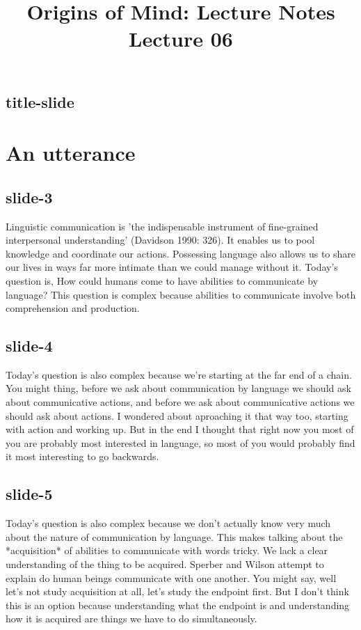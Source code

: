 \documentclass[12pt,\papersize]{extarticle}
\begin{document}
\setlength\footnotesep{1em}









\title {Origins of Mind: Lecture Notes \\ Lecture 06}
 
\maketitle
 
 
\subsection{title-slide}
 
\section{An utterance}
 
 
\subsection{slide-3}
Linguistic communication is 'the indispensable instrument of fine-grained interpersonal understanding' (Davidson 1990: 326).
It enables us to pool knowledge and coordinate our actions.
Possessing language also allows us to share our lives in ways far more intimate than we could manage without it.
Today's question is, How could humans come to have abilities to communicate by language?
This question is complex because abilities to communicate involve both comprehension and production.
 
 
\subsection{slide-4}
Today's question is also complex because we're starting at the far end of a chain.
You might thing, before we ask about communication by language we should ask about communicative actions, and before we ask about communicative actions we should ask about actions.
I wondered about aproaching it that way too, starting with action and working up.
But in the end I thought that right now you most of you are probably most interested in language, so most of you would probably find it most interesting to go backwards.
 
 
\subsection{slide-5}
Today's question is also complex because we don't actually know very much about the nature of communication by language.
This makes talking about the *acquisition* of abilities to communicate with words tricky.
We lack a clear understanding of the thing to be acquired.
Sperber and Wilson attempt to explain do human beings communicate with one another.
You might say, well let's not study acquisition at all, let's study the endpoint first.
But I don't think this is an option because understanding what the endpoint is and understanding how it is acquired are things we have to do simultaneously.
 
\end{document}
